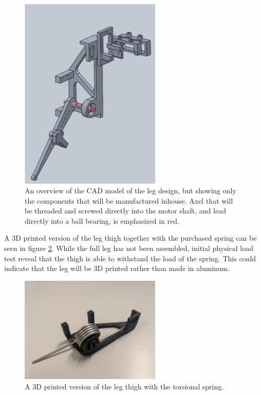 \begin{figure}[h!]
    \centering
    \includegraphics[width=0.6\textwidth]{Images/manufacture_only2.png}
    \caption{An overview of the CAD model of the leg design, but showing only the components that will be manufactured inhouse. Axel that will be threaded and screwed directly into the motor shaft, and lead directly into a ball bearing, is emphasized in red. }
    \label{fig:manufacture_only}
\end{figure}

A 3D printed version of the leg thigh together with the purchased spring can be seen in figure \ref{fig:printed_leg_and_spring}. While the full leg has not been assembled, initial physical load test reveal that the thigh is able to withstand the load of the spring. This could indicate that the leg will be 3D printed rather than made in aluminum.

\begin{figure}[h!]
    \centering
    \includegraphics[width=0.6\textwidth]{Images/printed_leg_and_spring.jpg}
    \caption{A 3D printed version of the leg thigh with the torsional spring.}
    \label{fig:printed_leg_and_spring}
\end{figure}

